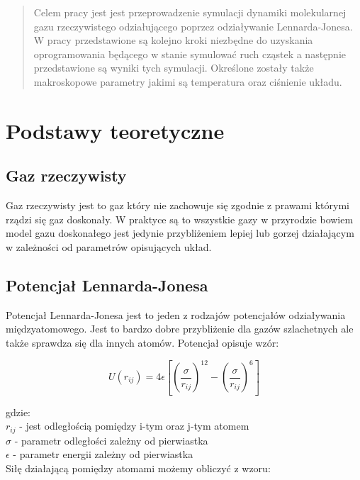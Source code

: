 \documentclass[a4paper,10pt]{article}
\begin{document}
\tableofcontents
\newpage
\begin{abstract}
Celem pracy jest jest przeprowadzenie symulacji dynamiki molekularnej gazu rzeczywistego odziałującego poprzez odziaływanie Lennarda-Jonesa. W pracy przedstawione są kolejno kroki niezbędne do uzyskania oprogramowania będącego w stanie symulować ruch cząstek a następnie przedstawione są wyniki tych symulacji. Określone zostały także makroskopowe parametry jakimi są temperatura oraz ciśnienie układu.
\end{abstract}

\section{Podstawy teoretyczne}

\subsection{Gaz rzeczywisty}
Gaz rzeczywisty jest to gaz który nie zachowuje się zgodnie z prawami którymi rządzi się gaz doskonały. W praktyce są to wszystkie gazy w przyrodzie bowiem model gazu doskonałego jest jedynie przybliżeniem lepiej lub gorzej działającym w zależności od parametrów opisujących układ.

\subsection{Potencjał Lennarda-Jonesa}

Potencjał Lennarda-Jonesa jest to jeden z rodzajów potencjałów odziaływania międzyatomowego. Jest to bardzo dobre przybliżenie dla gazów szlachetnych ale także sprawdza się dla innych atomów. Potencjał opisuje wzór:

\begin{equation}\label{eq:2}
U(r_{ij}) = 4\epsilon\left[\left(\frac{\sigma}{r_{ij}}\right)^{12} - \left(\frac{\sigma}{r_{ij}}\right)^6\right]
\end{equation}

gdzie:\\
$r_{ij}$ - jest odległością pomiędzy i-tym oraz j-tym atomem\\
$\sigma$ - parametr odległości zależny od pierwiastka\\
$\epsilon$ - parametr energii zależny od pierwiastka\\

Siłę działającą pomiędzy atomami możemy obliczyć z wzoru:
\end{document}
